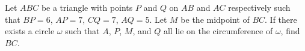 Let $ABC$ be a triangle with points $P$ and $Q$ on $AB$ and $AC$ respectively such that $BP=6$, $AP=7$, $CQ=7$, $AQ=5$. Let $M$ be the midpoint of $BC$. If there exists a circle $\omega$ such that $A$, $P$, $M$, and $Q$ all lie on the circumference of $\omega$, find $BC$.
